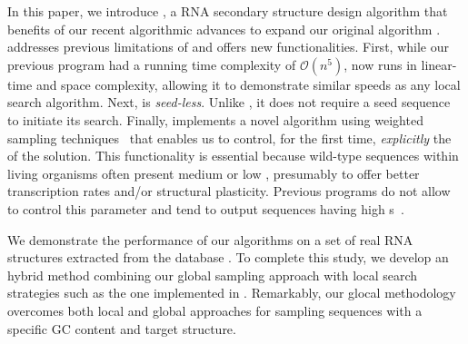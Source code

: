 In this paper, we introduce \ourprog, a RNA secondary structure design algorithm that benefits of our recent algorithmic advances \cite{Reinharz:2013aa} to expand our original \RNAensign algorithm \cite{Levin:2012kx}. \ourprog addresses previous limitations of \RNAensign and offers new functionalities. First, while our previous program had a running time complexity of $\mathcal{O}(n^5)$, \ourprog now runs in linear-time and space complexity, allowing it to demonstrate similar speeds as any local search algorithm. Next, \ourprog is \textit{seed-less}. Unlike \RNAensign, it does not require a seed sequence to initiate its search. Finally, \ourprog implements a novel algorithm using weighted sampling techniques~\cite{Bodini2010} that enables us to control, for the first time, \textit{explicitly} the \GCContent of the solution. This functionality is essential because wild-type sequences within living organisms often present medium or low \GCContent, presumably to offer better transcription rates and/or structural plasticity. Previous programs do not allow to control this parameter and tend to output sequences having high \GCContent{}s~\cite{Lyngso:2012vn}. 

We demonstrate the performance of our algorithms on a set of real RNA structures extracted from the \RNASTRAND database \cite{andronescu2008rna}. To complete this study, we develop an hybrid method combining our global sampling approach with local search strategies such as the one implemented in \RNAinverse.  Remarkably, our glocal methodology overcomes both local and global approaches  for sampling sequences with a specific GC content and target structure.